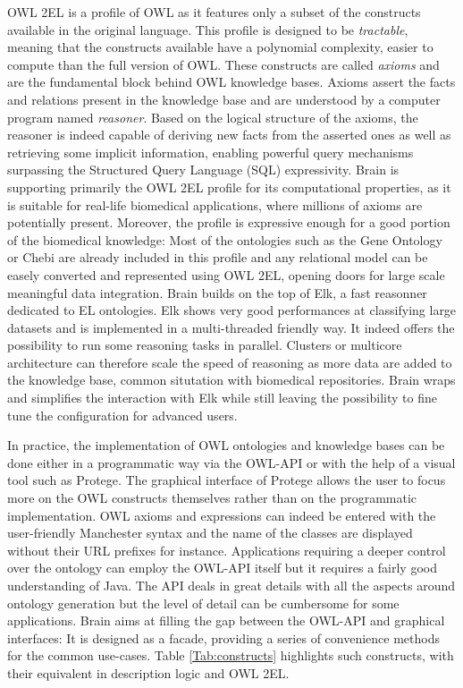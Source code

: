 \documentclass{bioinfo}
\begin{document}
OWL 2EL is a profile of OWL as it features only a subset of the constructs available in the original language. This profile is
designed to be \emph{tractable}, meaning that the constructs available have a polynomial complexity, easier to compute than the full 
version of OWL. These constructs are called \emph{axioms} and are the fundamental block behind OWL knowledge bases.
Axioms assert the facts and relations present in the knowledge base and are understood by a computer program named \emph{reasoner}. 
Based on the logical structure of the axioms, the reasoner is indeed capable of deriving new facts from the asserted ones as well as retrieving
some implicit information, enabling powerful query mechanisms surpassing the Structured Query Language (SQL) expressivity. 
Brain is supporting primarily the OWL 2EL profile for its computational properties, as it is suitable for real-life biomedical applications, 
where millions of axioms are potentially present.
Moreover, the profile is expressive enough for a good portion of the biomedical knowledge: Most of the ontologies such as the Gene Ontology or 
Chebi are already included in this profile and any relational model can be easely converted and represented using OWL 2EL, opening doors
for large scale meaningful data integration.
Brain builds on the top of Elk, a fast reasonner dedicated to EL ontologies. Elk shows very good performances at classifying 
large datasets and is implemented in a multi-threaded friendly way. It indeed offers the possibility to run some reasoning tasks in parallel.
Clusters or multicore architecture can therefore scale the speed of reasoning as more data are added to the knowledge base, common
situtation with biomedical repositories. Brain wraps and simplifies the interaction with Elk while still leaving the possibility to fine tune 
the configuration for advanced users.

In practice, the implementation of OWL ontologies and knowledge bases can be done either in a programmatic way via the OWL-API or with the
help of a visual tool such as Protege. The graphical interface of Protege allows the user to focus more on the OWL constructs themselves 
rather than on the programmatic implementation. OWL axioms and expressions can indeed be entered with the user-friendly Manchester syntax 
and the name of the classes are displayed without their URL prefixes for instance. Applications requiring a deeper control over the ontology
can employ the OWL-API itself but it requires a fairly good understanding of Java. The API deals in great details with all the aspects
around ontology generation but the level of detail can be cumbersome for some applications. Brain aims at filling the gap between the OWL-API
and graphical interfaces: It is designed as a facade, providing a series of convenience methods for the common
use-cases. Table \ref{Tab:constructs} highlights such constructs, with their equivalent in description logic and OWL 2EL.
\end{document}
